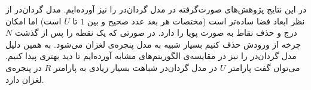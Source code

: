 
در این نتایج پژوهش‌های صورت‌گرفته در مدل گردان‌در را نیز آورده‌ایم. مدل گردان‌در از نظر ابعاد فضا ساده‌تر است (مختصات هر بعد عدد صحیح و بین $1$ تا $U$ است) اما امکان درج و حذف نقاط به صورت پویا را دارد. در صورتی که یک نقطه را پس از گذشت $N$ چرخه از ورودش حذف کنیم بسیار شبیه به مدل پنجره‌ی لغزان می‌شود. به همین دلیل مدل گردان‌در را نیز در مقایسه‌ی الگوریتم‌های مشابه آورده‌ایم تا دید بهتری پیدا کنیم. می‌توان گفت پارامتر $U$ در مدل گردان‌در شباهت بسیار زیادی به پارامتر $R$ در پنجره‌ی لغزان دارد.\\
